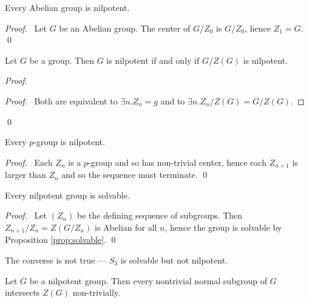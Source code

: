\begin{prop}
Every Abelian group is nilpotent.
\end{prop}

\begin{proof}
\pf\ Let $G$ be an Abelian group. The center of $G/Z_0$ is $G/Z_0$, hence $Z_1 = G$. \qed
\end{proof}

\begin{prop}
Let $G$ be a group. Then $G$ is nilpotent if and only if $G/Z(G)$ is nilpotent.
\end{prop}

\begin{proof}
\pf
{}
\begin{proof}
	\pf\ Both are equivalent to $\exists n. Z_n = g$ and to $\exists n. Z_n/Z(G) = G/Z(G)$.
\end{proof}
\qed
\end{proof}

\begin{prop}
Every $p$-group is nilpotent.
\end{prop}

\begin{proof}
\pf\ Each $Z_n$ is a $p$-group and so has non-trivial center, hence each $Z_{n+1}$ is larger than $Z_n$ and so the sequence must terminate. \qed
\end{proof}

\begin{prop}
Every nilpotent group is solvable.
\end{prop}

\begin{proof}
\pf\ Let $(Z_n)$ be the defining sequence of subgroups. Then $Z_{n+1}/Z_n = Z(G/Z_n)$ is Abelian for all $n$, hence the group is solvable by Proposition \ref{prop:solvable}. \qed
\end{proof}

\begin{ex}
The converse is not true --- $S_3$ is solvable but not nilpotent.
\end{ex}

\begin{prop}
Let $G$ be a nilpotent group. Then every nontrivial normal subgroup of $G$ intersects $Z(G)$ non-trivially.
\end{prop}

